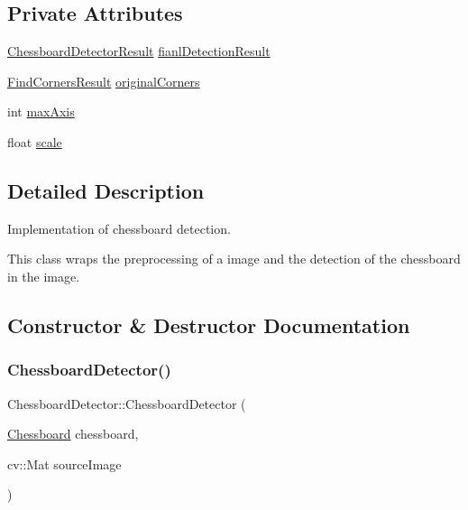 \subsection*{Private Attributes}
\begin{DoxyCompactItemize}
\item 
\hyperlink{struct_chessboard_detector_result}{Chessboard\+Detector\+Result} \hyperlink{class_chessboard_detector_a0694ee14ff2ca2e9c0a815fd18f321cd}{fianl\+Detection\+Result}
\item 
\hyperlink{struct_find_corners_result}{Find\+Corners\+Result} \hyperlink{class_chessboard_detector_a726c92a071aa8c46d67f33c7a0760d54}{original\+Corners}
\item 
int \hyperlink{class_chessboard_detector_a5d5dc8aaf92fb5ed7e73892ad678ec96}{max\+Axis}
\item 
float \hyperlink{class_chessboard_detector_ac5594a662e5f276b5f0e5450b883efa0}{scale}
\end{DoxyCompactItemize}


\subsection{Detailed Description}
Implementation of chessboard detection. 

This class wraps the preprocessing of a image and the detection of the chessboard in the image. 

\subsection{Constructor \& Destructor Documentation}
\mbox{\label{class_chessboard_detector_aebbd98195c5f2b06ca0f10fb65d9211e}} 
\subsubsection{\texorpdfstring{Chessboard\+Detector()}{ChessboardDetector()}}
{\footnotesize\ttfamily Chessboard\+Detector\+::\+Chessboard\+Detector (\begin{DoxyParamCaption}\item[{\hyperlink{class_chessboard}{Chessboard}}]{chessboard,  }\item[{cv\+::\+Mat}]{source\+Image }\end{DoxyParamCaption})}



